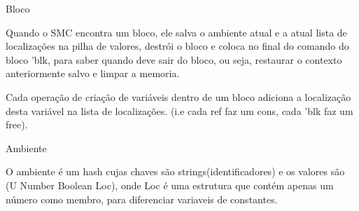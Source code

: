 \documentclass{beamer}
\begin{document}
\begin{frame}{Bloco}

Quando o SMC encontra um bloco, ele salva o ambiente atual e a atual lista de localizações na pilha de valores, destrói o bloco e coloca no final do comando do bloco 'blk, para saber quando deve sair do bloco, ou seja, restaurar o contexto anteriormente salvo e limpar a memoria.
 
Cada operação de criação de variáveis dentro de um bloco adiciona a localização desta variável na lista de localizações. (i.e cada ref faz um cons, cada 'blk faz um free).
\end{frame}


\begin{frame}{Ambiente}

O ambiente é um hash cujas chaves são strings(identificadores) e os valores são (U Number Boolean Loc), onde Loc é uma estrutura que contém apenas um número como membro,
para diferenciar variaveis de constantes.

\end{frame}
\end{document}
